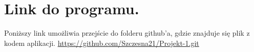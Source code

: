 \section{Link do programu.}
Poniższy link umożliwia przejście do folderu github'a, gdzie znajduje się plik z kodem aplikacji.
\url{https://github.com/Szczesna21/Projekt-1.git}